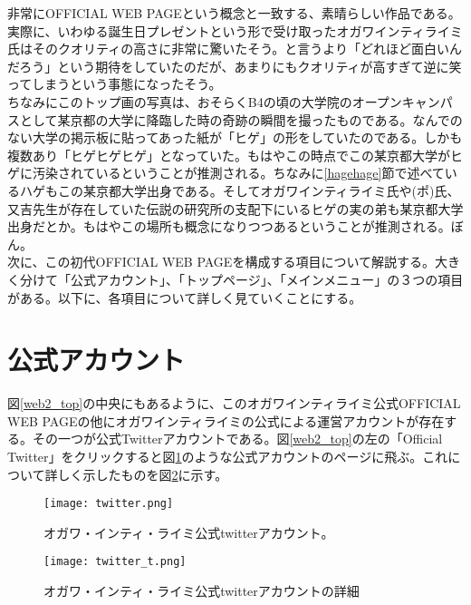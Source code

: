 非常にOFFICIAL WEB PAGEという概念と一致する、素晴らしい作品である。実際に、いわゆる誕生日プレゼントという形で受け取ったオガワインティライミ氏はそのクオリティの高さに非常に驚いたそう。と言うより「どれほど面白いんだろう」という期待をしていたのだが、あまりにもクオリティが高すぎて逆に笑ってしまうという事態になったそう。\\
ちなみにこのトップ画の写真は、おそらくB4の頃の大学院のオープンキャンパスとして某京都の大学に降臨した時の奇跡の瞬間を撮ったものである。なんでのない大学の掲示板に貼ってあった紙が「ヒゲ」の形をしていたのである。しかも複数あり「ヒゲヒゲヒゲ」となっていた。もはやこの時点でこの某京都大学がヒゲに汚染されているということが推測される。ちなみに\ref{hagehage}節で述べているハゲもこの某京都大学出身である。そしてオガワインティライミ氏や(ポ)氏、又吉先生が存在していた伝説の研究所の支配下にいるヒゲの実の弟も某京都大学出身だとか。もはやこの場所も概念になりつつあるということが推測される。ぼん。\\
次に、この初代OFFICIAL WEB PAGEを構成する項目について解説する。大きく分けて「公式アカウント」、「トップページ」、「メインメニュー」の３つの項目がある。以下に、各項目について詳しく見ていくことにする。\\

\section{公式アカウント}
図\ref{web2_top}の中央にもあるように、このオガワインティライミ公式OFFICIAL WEB PAGEの他にオガワインティライミの公式による運営アカウントが存在する。その一つが公式Twitterアカウントである。図\ref{web2_top}の左の「Official Twitter」をクリックすると図\ref{twitter}のような公式アカウントのページに飛ぶ。これについて詳しく示したものを図\ref{twitter_t}に示す。\\


\begin{figure}[H]
  \centering
  \texttt{[image: twitter.png]}
  \caption{オガワ・インティ・ライミ公式twitterアカウント。}
\label{twitter}
\end{figure}

\begin{figure}[H]
  \centering
  \texttt{[image: twitter\_t.png]}
  \caption{オガワ・インティ・ライミ公式twitterアカウントの詳細}
\label{twitter_t}
\end{figure}

